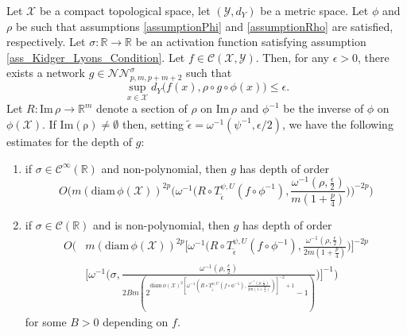 \documentclass[anon,12pt]{colt2021} %
\newcommand{\xxx}{\mathcal{X}}
\newcommand{\yyy}{\mathcal{Y}}
\begin{document}
\begin{theorem} \label{thrm_main_Global}
Let $\xxx$ be a compact topological space, let $(\yyy, d_{Y})$ be a metric space. Let $\phi$ and $\rho$ be such that assumptions \ref{assumptionPhi} and \ref{assumptionRho} are satisfied, respectively. Let $\sigma: \mathbb{R} \rightarrow \mathbb{R}$ be an activation function satisfying assumption \ref{ass_Kidger_Lyons_Condition}. Let $f \in \mathcal{C}(\xxx, \yyy)$. Then, for any $\epsilon >0$, there exists a network $g \in \mathcal{NN}_{p,m,p+m+2}^{\sigma}$ such that
\begin{equation} \label{ineqApproxg}
    \sup_{x \in \xxx} d_{Y} \big ( f(x), \rho \circ g \circ \phi (x) \big) \leq \epsilon.
\end{equation}
Let $R: \text{Im} \, \rho \rightarrow \mathbb{R}^{m}$ denote a section of $\rho$ on $\text{Im} \, \rho$ and $\phi^{-1}$ be the inverse of $\phi$ on $\phi(\xxx)$.
%
If $\operatorname{Im(\rho)}\neq \emptyset$ then, setting $\tilde \epsilon = \omega^{-1}(\psi^{-1}, \epsilon/2)$, we have the following estimates for the depth of $g$:
\begin{enumerate}[label=(i),leftmargin=1.75em]
    \item if $\sigma \in \mathcal{C}^{\infty}(\mathbb{R})$ and non-polynomial, then $g$ has depth of order
    \begin{equation*}
        O\bigg(m (\text{diam} \, \phi(\mathcal{X}))^{2p} \bigg(\omega^{-1} (R \circ T_{\tilde \epsilon}^{\psi, U} (f \circ \phi^{-1}), \frac{\omega^{-1}(\rho, \frac{\epsilon}{2})}{m(1+\frac{p}{4})} \big) \bigg)^{-2p} \bigg)
    \end{equation*}
    \item if $\sigma \in \mathcal{C}(\mathbb{R})$ and is non-polynomial, then $g$ has depth of order
    \begin{align*}
        O \bigg( &m (\text{diam} \, \phi(\mathcal{X}))^{2p} \bigg[\omega^{-1} \big(R \circ T_{\tilde \epsilon}^{\psi, U} (f \circ \phi^{-1}), \frac{\omega^{-1}(\rho, \frac{\epsilon}{2})}{2m(1+\frac{p}{4})} \big) \bigg]^{-2p} 
        \\
        &
        \bigg[ \omega^{-1} \big( \sigma, \frac{\omega^{-1}(\rho, \frac{\epsilon}{2})}{2Bm(2^{\text{diam} \, \phi(\mathcal{X})^{2}[\omega^{-1}(R \circ T_{\tilde \epsilon}^{\psi, U} (f \circ \phi^{-1}), \frac{\omega^{-1}(\rho, \frac{\epsilon}{2})}{2m(1+\frac{p}{4})})]^{-2}+1} -1)} \big) \bigg]^{-1}\bigg)
    \end{align*}
    for some $B > 0$ depending on $f$.

\end{enumerate}
\end{theorem}
\end{document}
